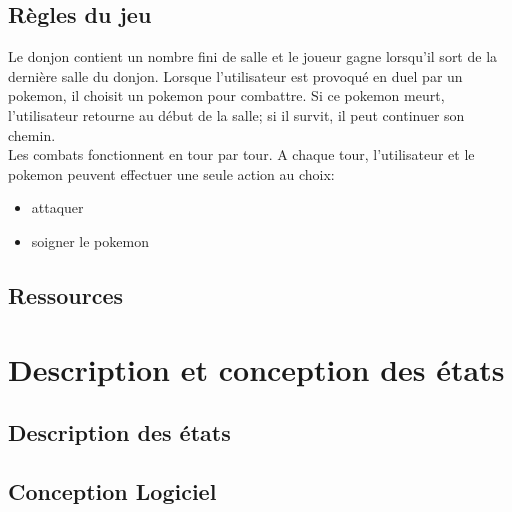 \documentclass[a4paper,12pt]{article}
\begin{document}
    \subsection{Règles du jeu}
    Le donjon contient un nombre fini de salle et le joueur gagne lorsqu'il sort de la dernière salle du donjon.
    Lorsque l'utilisateur est provoqué en duel par un pokemon, il choisit un pokemon pour combattre. Si ce pokemon meurt, l'utilisateur retourne au début de la salle; si il survit, il peut continuer son chemin.
    \\Les combats fonctionnent en tour par tour. A chaque tour, l'utilisateur et le pokemon peuvent effectuer une seule action au choix: \begin{itemize}
                                                                                                                                             \item attaquer
                                                                                                                                             \item soigner le pokemon
    \end{itemize}


    \subsection{Ressources}



    \clearpage
    \section{Description et conception des états}

    \subsection{Description des états}


    \subsection{Conception Logiciel}


\end{document}
